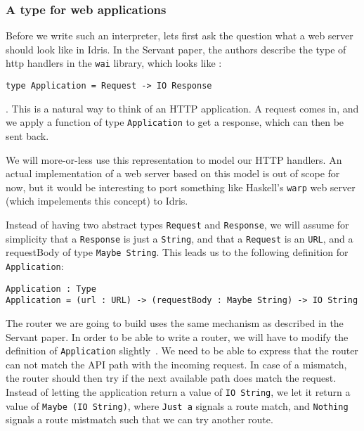 \documentclass[12pt,a4paper]{article}
\begin{document}
\subsubsection{A type for web applications}
Before we write such an interpreter, lets first ask the question what a web server should look like in Idris. In the Servant paper, the authors describe the type of http handlers in the \texttt{wai} library, which looks like \cite{servant}:
\begin{verbatim}
type Application = Request -> IO Response
\end{verbatim}.
This is a natural way to think of an HTTP application. A request comes in, and we apply a function of type \texttt{Application} to get a response, which can then be sent back.

We will more-or-less use this representation to model our HTTP handlers. An actual implementation of a web server based on this model is out of scope for now, but it would be interesting to port something like Haskell's \texttt{warp} web server (which impelements this concept) to Idris.

Instead of having two abstract types \texttt{Request} and \texttt{Response}, we will assume for simplicity that a \texttt{Response} is just a \texttt{String}, and that a \texttt{Request} is an \texttt{URL}, and a requestBody of type \texttt{Maybe String}. This leads us to the following definition for \texttt{Application}:

\begin{verbatim}
Application : Type
Application = (url : URL) -> (requestBody : Maybe String) -> IO String
\end{verbatim}

The router we are going to build uses the same mechanism as described in the Servant paper. In order to be able to write a router, we will have
to modify the definition of \texttt{Application} slightly~\cite{servant}. We need to be able to express that the router can not
match the API path with the incoming request. In case of a mismatch, the router should then try if the next available path does match the request.
Instead of letting the application return a value of \texttt{IO String}, we let it return a value of \texttt{Maybe (IO String)}, where \texttt{Just a} signals a route match, and \texttt{Nothing} signals a route mistmatch such that we can try another route.
\end{document}
